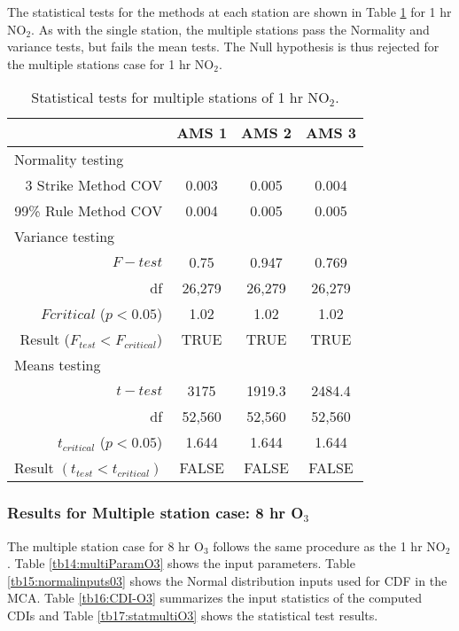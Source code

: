 The statistical tests for the methods at each station are shown in Table \ref{tb13:stat-testsNO2} for 1 hr NO$_{2}$. As with the single station, the multiple stations pass the Normality and variance tests, but fails the mean tests. The Null hypothesis is thus rejected for the multiple stations case for 1 hr NO$_{2}$.
% 
\begin{table}[!htb]
\centering
\caption{Statistical tests for multiple stations of 1 hr NO$_{2}$.}
\label{tb13:stat-testsNO2}
\begin{tabular}{@{}rccc@{}}
\toprule
\multicolumn{1}{l}{} & \textbf{AMS 1} & \textbf{AMS 2} & \textbf{AMS 3} \\ \midrule
\multicolumn{1}{l}{Normality testing} &  &  &  \\
3 Strike Method COV & 0.003 & 0.005 & 0.004 \\
99\% Rule Method COV & 0.004 & 0.005 & 0.005 \\
\multicolumn{1}{l}{Variance testing} &  &  &  \\
$F-test$ & 0.75 & 0.947 & 0.769 \\
df & 26,279 & 26,279 & 26,279 \\
$Fcritical$ ($p<0.05$) & 1.02 & 1.02 & 1.02 \\
Result ($F_{test} < F_{critical}$) & TRUE & TRUE & TRUE \\
\multicolumn{1}{l}{Means testing} &  &  &  \\
$t-test$ & 3175 & 1919.3 & 2484.4 \\
df & 52,560 & 52,560 & 52,560 \\
$t_{critical}$ ($p<0.05$) & 1.644 & 1.644 & 1.644 \\
\multicolumn{1}{l}{Result $(t_{test} < t_{critical})$} & FALSE & FALSE & FALSE \\ \bottomrule
\end{tabular}
\end{table}

\subsubsection{Results for Multiple station case: 8 hr O$_{3}$}

The multiple station case for 8 hr O$_{3}$ follows the same procedure as the 1 hr NO$_{2}$. Table \ref{tb14:multiParamO3} shows the input parameters. Table \ref{tb15:normalinputs03} shows the Normal distribution inputs used for CDF in the MCA. Table \ref{tb16:CDI-O3} summarizes the input statistics of the computed CDIs and Table \ref{tb17:statmultiO3} shows the statistical test results.

